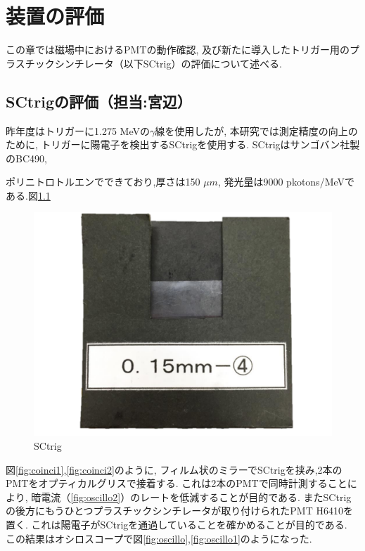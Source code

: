 \chapter{装置の評価}
\label{SCtrig}


この章では磁場中におけるPMTの動作確認,
及び新たに導入したトリガー用のプラスチックシンチレータ（以下SCtrig）の評価について述べる.

\section{SCtrigの評価（担当:宮辺）}


昨年度はトリガーに1.275 MeVの$\gamma$線を使用したが,
本研究では測定精度の向上のために,
トリガーに陽電子を検出するSCtrigを使用する.
SCtrigはサンゴバン社製のBC490,

ポリニトロトルエンでできており,厚さは150 $\si{\mu m}$,
発光量は9000 pkotons/MeVである.図\ref{fig:SCtrig}

\begin{figure}[H]
\centering
\includegraphics[keepaspectratio,scale=0.3]{fig/ybm/SCtrig.pdf}
\caption{SCtrig}
\label{fig:SCtrig}
\end{figure}


図\ref{fig:coinci1},\ref{fig:coinci2}のように,
フィルム状のミラーでSCtrigを挟み,2本のPMTをオプティカルグリスで接着する.
これは2本のPMTで同時計測することにより,
暗電流（\ref{fig:oscillo2}）のレートを低減することが目的である.
またSCtrigの後方にもうひとつプラスチックシンチレータが取り付けられたPMT H6410を置く.
これは陽電子がSCtrigを通過していることを確かめることが目的である.
この結果はオシロスコープで図\ref{fig:oscillo},\ref{fig:oscillo1}のようになった.


